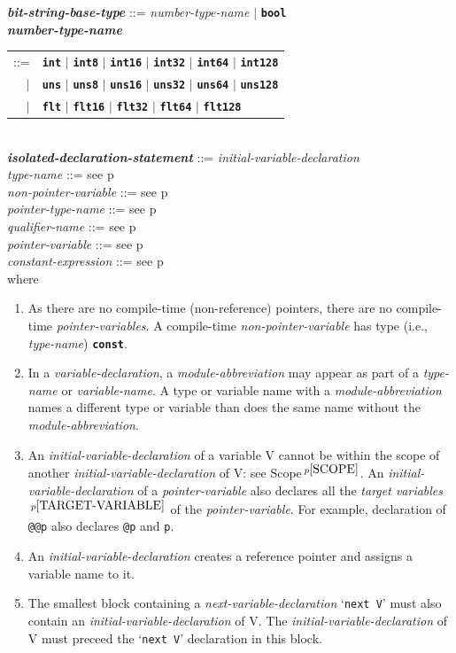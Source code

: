 \documentclass[12pt]{article}
\newcommand{\TT}[1]{{\tt \bfseries #1}}
\newcommand{\ttkey}[1]{{\tt \bfseries #1}}
\newcommand{\emkey}[1]{{\em \bfseries #1}}
\newcommand{\pagref}[1]{p\pageref{#1}}
\newcommand{\pagnote}[1]{$\,^{p\pageref{#1}}$}
\newenvironment{indpar}[1][0.3in]%
	{\begin{list}{}%
		     {\setlength{\itemsep}{0in}%
		      \setlength{\topsep}{0in}%
		      \setlength{\parsep}{1ex}%
		      \setlength{\labelwidth}{#1}%
		      \setlength{\leftmargin}{#1}%
		      \addtolength{\leftmargin}{\labelsep}}%
	 \item}%
	{\end{list}}
\begin{document}
\begin{indpar}
\emkey{bit-string-base-type} ::= {\em number-type-name} $|$ \TT{bool}
\\[0.5ex]
\emkey{number-type-name}\label{NUMBER-TYPE-NAME}
    \begin{tabular}[t]{@{}rl}
    ::= &  \ttkey{int} $|$ \ttkey{int8} $|$ \ttkey{int16} $|$ \ttkey{int32}
                       $|$ \ttkey{int64} $|$ \ttkey{int128} \\
    $|$ &  \ttkey{uns} $|$ \ttkey{uns8} $|$ \ttkey{uns16} $|$ \ttkey{uns32}
                       $|$ \ttkey{uns64} $|$ \ttkey{uns128} \\
    $|$ &  \ttkey{flt} $|$ \ttkey{flt16} $|$ \ttkey{flt32} $|$ \ttkey{flt64}
                         $|$ \ttkey{flt128} \\
    \end{tabular}
\\[0.5ex]
\emkey{isolated-declaration-statement}\label{ISOLATED-DECLARATION-STATEMENT}
    ::= {\em initial-variable-declaration}
\\[0.5ex]
{\em type-name} ::= see \pagref{TYPE-NAME}
\\[0.5ex]
{\em non-pointer-variable} ::= see \pagref{NON-POINTER-VARIABLE}
\\[0.5ex]
{\em pointer-type-name} ::= see \pagref{POINTER-TYPE-NAME}
\\[0.5ex]
{\em qualifier-name} ::= see \pagref{QUALIFIER-NAME}
\\[0.5ex]
{\em pointer-variable} ::= see \pagref{POINTER-VARIABLE}
\\[0.5ex]
{\em constant-expression} ::= see \pagref{CONSTANT-EXPRESSION}
\\[2ex]
where
\begin{enumerate}
\item As there are no compile-time (non-reference) pointers, there are
no compile-time {\em pointer-variables}.  A compile-time
{\em non-pointer-variable} has type (i.e., {\em type-name}) \TT{const}.
\item In a {\em variable-declaration},
a {\em module-abbreviation} may appear as part of
a {\em type-name} or {\em variable-name}.
A type or variable name with a {\em module-abbreviation}
names a different type or variable than does the same
name without the {\em module-abbreviation}.
\item An {\em initial-variable-declaration} of a variable V cannot
be within the scope of another
{\em initial-variable-declaration} of V: see Scope\pagnote{SCOPE}.
An {\em initial-variable-declara\-tion} of a {\em pointer-variable}
also declares all the {\em target variables}\pagnote{TARGET-VARIABLE}
of the {\em pointer-variable}.  For example, declaration of {\tt @@p}
also declares {\tt @p} and {\tt p}.
\item \label{INITIAL-REFERENCE-POINTER}
An {\em initial-variable-declaration} creates a reference pointer
and assigns a variable name to it.
\item The smallest block containing a {\em next-variable-declaration}
`{\tt next V}' must also contain an {\em initial-variable-declaration}
of V.  The {\em initial-variable-declaration} of V must preceed the
`{\tt next V}' declaration in this block.


\end{enumerate}
\end{indpar}
\end{document}
